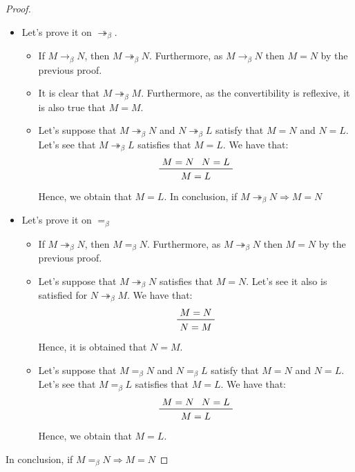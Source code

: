 \documentclass[11pt]{article}
\theoremstyle{definition}
\theoremstyle{remark}
\theoremstyle{remark}
\theoremstyle{definition}
\begin{document}
\begin{proof}
\begin{itemize}
    \item Let's prove it on $\twoheadrightarrow_\beta$.
          \begin{itemize}
            \item If $M \rightarrow_\beta N$, then
                  $M \twoheadrightarrow_\beta N$. Furthermore, as
                  $M \rightarrow_\beta N$ then $M = N$ by the previous proof.

            \item It is clear that $M \twoheadrightarrow_\beta M$. Furthermore,
                  as the convertibility is reflexive, it is also true that
                  $M = M$.

            \item Let's suppose that $M \twoheadrightarrow_\beta N$ and
                  $N \twoheadrightarrow_\beta L$ satisfy that $M = N$ and
                  $N = L$. Let's see that $M \twoheadrightarrow_\beta L$
                  satisfies that $M = L$. We have that:
                  \begin{equation*}
                    \prftree{M = N}{N = L}{M = L}
                  \end{equation*}
                  Hence, we obtain that $M = L$. In conclusion, if
                  $M \twoheadrightarrow_\beta N \Rightarrow M = N$
          \end{itemize}

    \item Let's prove it on $=_\beta$
          \begin{itemize}
            \item If $M \twoheadrightarrow_\beta N$, then $M =_\beta N$.
                  Furthermore, as $M \twoheadrightarrow_\beta N$ then $M = N$ by
                  the previous proof.

            \item Let's suppose that $M \twoheadrightarrow_\beta N$ satisfies
                  that $M = N$. Let's see it also is satisfied for
                  $N \twoheadrightarrow_\beta M$. We have that:
                  \begin{equation*}
                    \prftree{M = N}{N = M}
                  \end{equation*}
                  Hence, it is obtained that $N = M$.

            \item Let's suppose that $M =_\beta N$ and $N =_\beta L$ satisfy
                  that $M = N$ and $N = L$. Let's see that $M =_\beta L$
                  satisfies that $M = L$. We have that:
                  \begin{equation*}
                    \prftree{M = N}{N = L}{M = L}
                  \end{equation*}
                  Hence, we obtain that $M = L$.
          \end{itemize}
  \end{itemize}
  In conclusion, if $M =_\beta N \Rightarrow M = N$
\end{proof}
\end{document}
